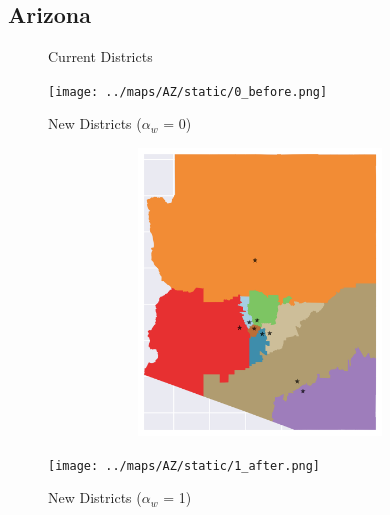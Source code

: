 \subsection{Arizona}
\begin{figure}[htb!] \centering
\caption{ Current Districts }
\texttt{[image: ../maps/AZ/static/0\_before.png]}
\caption{ New Districts ($\alpha_w$ = 0) }
\includegraphics[width=5in,height=3in,keepaspectratio]{../maps/AZ/static/0_after.png}
\caption{ New Districts ($\alpha_w$ = 1) }
\texttt{[image: ../maps/AZ/static/1\_after.png]}
\end{figure}

\clearpage
\newpage

